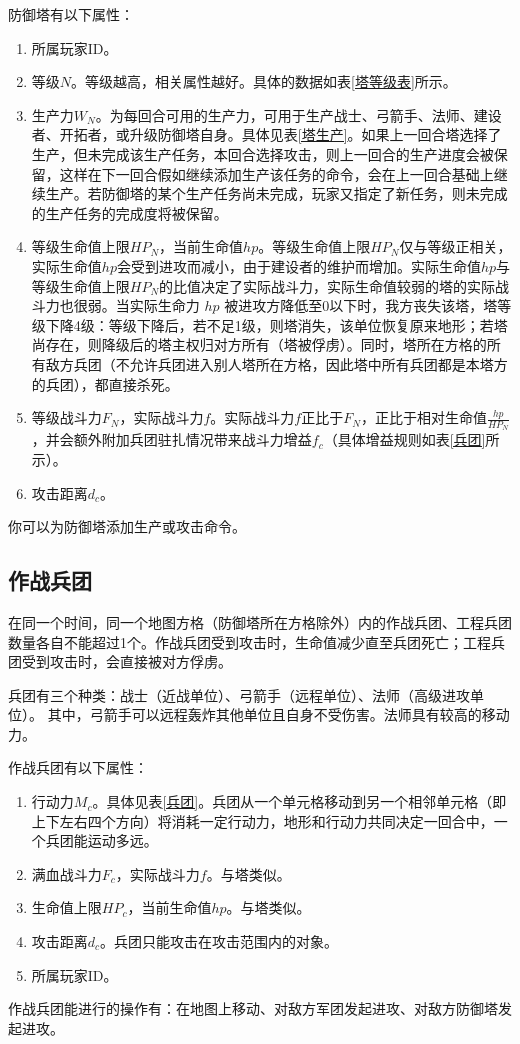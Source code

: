 \documentclass[a4paper,4pt]{article}
\begin{document}
防御塔有以下属性：
\begin{enumerate}[fullwidth, itemindent=2em, label=(\arabic*)]
  \item 所属玩家ID。
  \item 等级$N$。等级越高，相关属性越好。具体的数据如表\ref{塔等级表}所示。
  \item 生产力$W_N$。为每回合可用的生产力，可用于生产战士、弓箭手、法师、建设者、开拓者，或升级防御塔自身。具体见表\ref{塔生产}。如果上一回合塔选择了生产，但未完成该生产任务，本回合选择攻击，则上一回合的生产进度会被保留，这样在下一回合假如继续添加生产该任务的命令，会在上一回合基础上继续生产。若防御塔的某个生产任务尚未完成，玩家又指定了新任务，则未完成的生产任务的完成度将被保留。
  \item 等级生命值上限$HP_N$，当前生命值$hp$。等级生命值上限$HP_N$仅与等级正相关，实际生命值$hp$会受到进攻而减小，由于建设者的维护而增加。实际生命值$hp$与等级生命值上限$HP_N$的比值决定了实际战斗力，实际生命值较弱的塔的实际战斗力也很弱。当实际生命力 $hp$ 被进攻方降低至0以下时，我方丧失该塔，塔等级下降4级：等级下降后，若不足1级，则塔消失，该单位恢复原来地形；若塔尚存在，则降级后的塔主权归对方所有（塔被俘虏）。同时，塔所在方格的所有敌方兵团（不允许兵团进入别人塔所在方格，因此塔中所有兵团都是本塔方的兵团），都直接杀死。
  \item 等级战斗力$F_N$，实际战斗力$f$。实际战斗力$f$正比于$F_N$，正比于相对生命值$\frac{hp}{HP_N}$，并会额外附加兵团驻扎情况带来战斗力增益$f_c$（具体增益规则如表\ref{兵团}所示）。
  \item 攻击距离$d_c$。
\end{enumerate}
\par

你可以为防御塔添加生产或攻击命令。


\subsection{作战兵团}
在同一个时间，同一个地图方格（防御塔所在方格除外）内的作战兵团、工程兵团数量各自不能超过1个。作战兵团受到攻击时，生命值减少直至兵团死亡；工程兵团受到攻击时，会直接被对方俘虏。\par
兵团有三个种类：战士（近战单位）、弓箭手（远程单位）、法师（高级进攻单位）。
其中，弓箭手可以远程轰炸其他单位且自身不受伤害。法师具有较高的移动力。\par
作战兵团有以下属性：
\begin{enumerate}[fullwidth, itemindent=2em, label=(\arabic*)]
  \item 行动力$M_c$。具体见表\ref{兵团}。兵团从一个单元格移动到另一个相邻单元格（即上下左右四个方向）将消耗一定行动力，地形和行动力共同决定一回合中，一个兵团能运动多远。
  \item 满血战斗力$F_c$，实际战斗力$f$。与塔类似。
  \item 生命值上限$HP_c$，当前生命值$hp$。与塔类似。
  \item 攻击距离$d_c$。兵团只能攻击在攻击范围内的对象。
  \item 所属玩家ID。
\end{enumerate}
\par
作战兵团能进行的操作有：在地图上移动、对敌方军团发起进攻、对敌方防御塔发起进攻。
\end{document}
